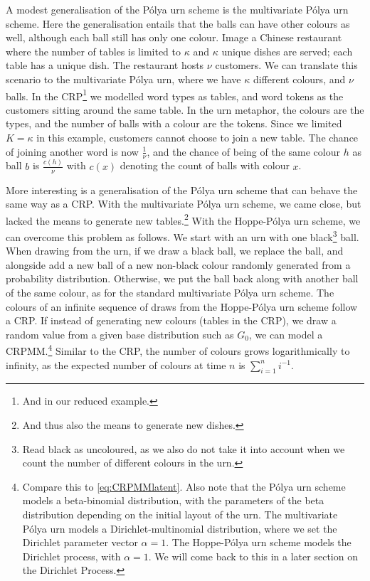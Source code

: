 A modest generalisation of the P\'olya urn scheme is the multivariate P\'olya urn scheme. Here the generalisation entails that the balls can have other colours as well, although each ball still has only one colour. Image a Chinese restaurant where the number of tables is limited to $\kappa$ and $\kappa$ unique dishes are served; each table has a unique dish. The restaurant hosts $\nu$ customers. We can translate this scenario to the multivariate P\'olya urn, where we have $\kappa$ different colours, and $\nu$ balls. In the CRP\footnote{And in our reduced example.} we modelled word types as tables, and word tokens as the customers sitting around the same table. In the urn metaphor, the colours are the types, and the number of balls with a colour are the tokens. Since we limited $K=\kappa$ in this example, customers cannot choose to join a new table. The chance of joining another word is now $\frac{1}{\nu}$, and the chance of being of the same colour $h$ as ball $b$ is $\frac{c(h)}{\nu}$ with $c(x)$ denoting the count of balls with colour $x$. 

More interesting is a generalisation of the P\'olya urn scheme that can behave the same way as a CRP. With the multivariate P\'olya urn scheme, we came close, but lacked the means to generate new tables.\footnote{And thus also the means to generate new dishes.} With the Hoppe-P\'olya urn scheme\cite{Hoppe1984Polya}, we can overcome this problem as follows. We start with an urn with one black\footnote{Read black as uncoloured, as we also do not take it into account when we count the number of different colours in the urn.} ball. When drawing from the urn, if we draw a black ball, we replace the ball, and alongside add a new ball of a new non-black colour randomly generated from a probability distribution. Otherwise, we put the ball back along with another ball of the same colour, as for the standard multivariate P\'olya urn scheme. The colours of an infinite sequence of draws from the Hoppe-P\'olya urn scheme follow a CRP. If instead of generating new colours (tables in the CRP), we draw a random value from a given base distribution such as $G_0$, we can model a CRPMM.\footnote{Compare this to \cref{eq:CRPMMlatent}. Also note that the P\'olya urn scheme models a beta-binomial distribution, with the parameters of the beta distribution depending on the initial layout of the urn. The multivariate P\'olya urn models a Dirichlet-multinomial distribution, where we set the Dirichlet parameter vector $\alpha=1$. The Hoppe-P\'olya urn scheme models the Dirichlet process, with $\alpha=1$. We will come back to this in a later section on the Dirichlet Process.} Similar to the CRP, the number of colours grows logarithmically to infinity, as the expected number of colours at time $n$ is $\sum_{i=1}^n i^{-1}$.

